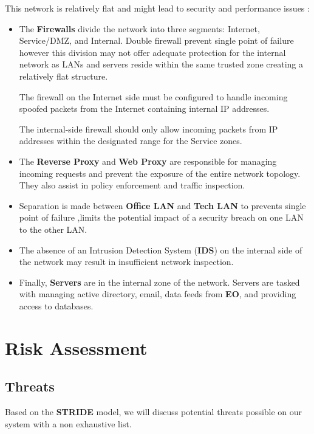 \documentclass[12pt]{article}
\begin{document}
This network is relatively flat and might lead to security and performance issues : 
\begin{itemize}
    \item The\textbf{ Firewalls }divide the network into three segments: Internet, Service/DMZ, and Internal. Double firewall prevent single point of failure however this division may not offer adequate protection for the internal network as LANs and servers reside within the same trusted zone creating a relatively flat structure.
    
    The firewall on the Internet side must be configured to handle incoming spoofed packets from the Internet containing internal IP addresses.
    
    The internal-side firewall should only allow incoming packets from IP addresses within the designated range for the Service zones.
    
    \item The \textbf{Reverse Proxy} and \textbf{Web Proxy} are responsible for managing incoming requests and prevent the exposure of the entire network topology. They also assist in policy enforcement and traffic inspection.
    
    \item Separation is made between \textbf{Office LAN} and \textbf{Tech LAN} to prevents single point of failure ,limits the potential impact of a security breach on one LAN to the other LAN.
    
    \item The absence of an Intrusion Detection System (\textbf{IDS}) on the internal side of the network may result in insufficient network inspection.

    \item Finally, \textbf{Servers} are in the internal zone of the network. Servers are tasked with  managing active directory, email, data feeds from \textbf{EO}, and providing access to databases.
\end{itemize}
\newpage
\section{Risk Assessment}\label{Sec: Assessment}

\subsection{Threats}
Based on the \textbf{STRIDE} model, we will discuss potential threats possible on our system with a non exhaustive list.
\end{document}

